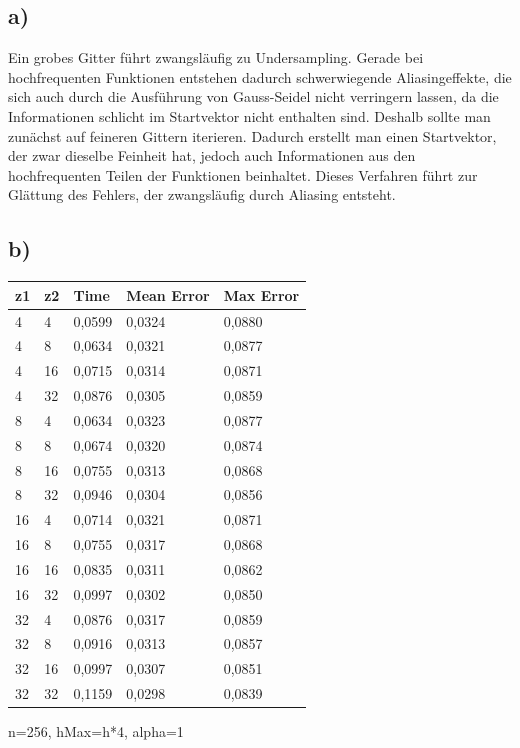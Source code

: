 \documentclass[paper = a4]{scrartcl}
\begin{document}
\subsection*{a)}
Ein grobes Gitter führt zwangsläufig zu Undersampling. Gerade bei hochfrequenten Funktionen entstehen dadurch schwerwiegende Aliasingeffekte, die sich auch durch die Ausführung von Gauss-Seidel nicht verringern lassen, da die Informationen schlicht im Startvektor nicht enthalten sind. Deshalb sollte man zunächst auf feineren Gittern iterieren. Dadurch erstellt man einen Startvektor, der zwar dieselbe Feinheit hat, jedoch auch Informationen aus den hochfrequenten Teilen der Funktionen beinhaltet. Dieses Verfahren führt zur Glättung des Fehlers, der zwangsläufig durch Aliasing entsteht.

\subsection*{b)}
\begin{tabular}{l|l|l|l|l}
\hline
z1 & z2 & Time   & Mean Error & Max Error\\
\hline
4  & 4  & 0,0599 & 0,0324     & 0,0880   \\
4  & 8  & 0,0634 & 0,0321     & 0,0877   \\
4  & 16 & 0,0715 & 0,0314     & 0,0871   \\
4  & 32 & 0,0876 & 0,0305     & 0,0859   \\
8  & 4  & 0,0634 & 0,0323     & 0,0877   \\
8  & 8  & 0,0674 & 0,0320     & 0,0874   \\
8  & 16 & 0,0755 & 0,0313     & 0,0868   \\
8  & 32 & 0,0946 & 0,0304     & 0,0856   \\
16 & 4  & 0,0714 & 0,0321     & 0,0871   \\
16 & 8  & 0,0755 & 0,0317     & 0,0868   \\
16 & 16 & 0,0835 & 0,0311     & 0,0862   \\
16 & 32 & 0,0997 & 0,0302     & 0,0850   \\
32 & 4  & 0,0876 & 0,0317     & 0,0859   \\
32 & 8  & 0,0916 & 0,0313     & 0,0857   \\
32 & 16 & 0,0997 & 0,0307     & 0,0851   \\
32 & 32 & 0,1159 & 0,0298     & 0,0839   \\
\hline
\end{tabular}
n=256, hMax=h*4, alpha=1\\
\end{document}
